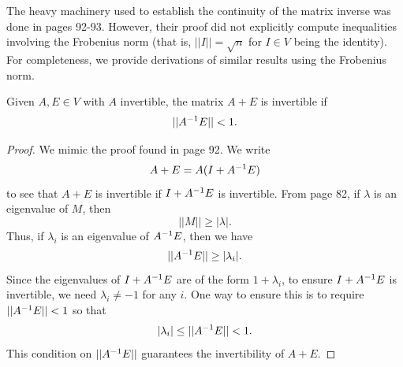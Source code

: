 \documentclass[letterpaper,titlepage]{article}
\begin{document}
The heavy machinery used to establish the continuity of the matrix inverse was done in \cite{Wilkinson} pages 92-93. However, their proof did not explicitly compute inequalities involving the Frobenius norm (that is, $||I|| = \sqrt{n}$ for $I \in V$ being the identity). For completeness, we provide derivations of similar results using the Frobenius norm.

\begin{lem}\label{lem:AplusE_invertible}
    Given $A,E \in V$ with $A$ invertible, the matrix $A+E$ is invertible if
    $$||A^{-1} E|| < 1.$$
\end{lem}
\begin{proof}
    We mimic the proof found in \cite{Wilkinson} page 92. We write
    \begin{equation}\label{eqn:rewrite_AplusE}
        A+E = A(I+A^{-1} E)
    \end{equation}
    to see that $A+E$ is invertible if $I+A^{-1} E$ is invertible. From \cite{Wilkinson} page 82, if $\lambda$ is an eigenvalue of $M$, then
    $$||M||\geq|\lambda|.$$
    Thus, if $\lambda_i$ is an eigenvalue of $A^{-1} E$, then we have
    $$||A^{-1} E|| \geq |\lambda_i|.$$
    Since the eigenvalues of $I+A^{-1} E$ are of the form $1+\lambda_i$, to ensure $I+A^{-1} E$ is invertible, we need $\lambda_i \neq -1$ for any $i$. One way to ensure this is to require $||A^{-1} E||<1$ so that
    $$|\lambda_i|\leq||A^{-1} E||< 1.$$
    This condition on $||A^{-1} E||$ guarantees the invertibility of $A+E$.
\end{proof}
\end{document}
